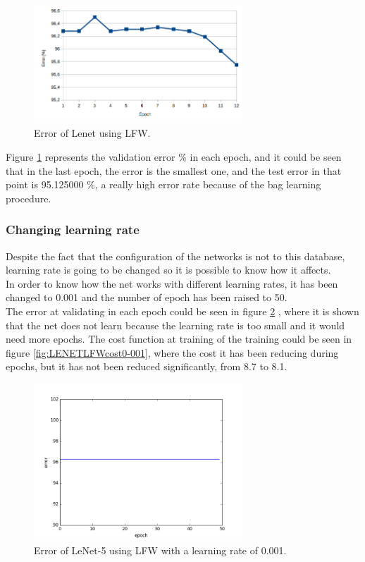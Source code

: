 \begin{figure}[htb]
\centering
\includegraphics[width=0.7\textwidth]{images/epoch_LFW.png}
\caption{Error of Lenet using LFW.} \label{fig:LENETLFW}
\end{figure}

Figure \ref{fig:LENETLFW} represents the validation error \% in each epoch, and it could be seen that in the last epoch, the error is the smallest one, and the test error in that point is 95.125000 \%, a really high error rate because of the bag learning procedure.\\

\subsubsection{Changing learning rate}
Despite the fact that the configuration of the networks is not to this database, learning rate is going to be changed so it is possible to know how it affects.\\

In order to know how the net works with different learning rates, it has been changed to 0.001 and the number of epoch has been raised to 50.\\

The error at validating in each epoch could be seen in figure \ref{fig:LENETLFWerror0-001} , where it is shown that the net does not learn because the learning rate is too small and it would need more epochs. The cost function at training of the training could be seen in figure \ref{fig:LENETLFWcost0-001}, where the cost it has been reducing during epochs, but it has not been reduced significantly, from 8.7 to 8.1.\\

\begin{figure}[htb]
\centering
\includegraphics[width=0.7\textwidth]{images/LFW_learningrate/error_0_001.png}
\caption{Error of LeNet-5 using LFW with a learning rate of 0.001.} \label{fig:LENETLFWerror0-001}
\end{figure}

